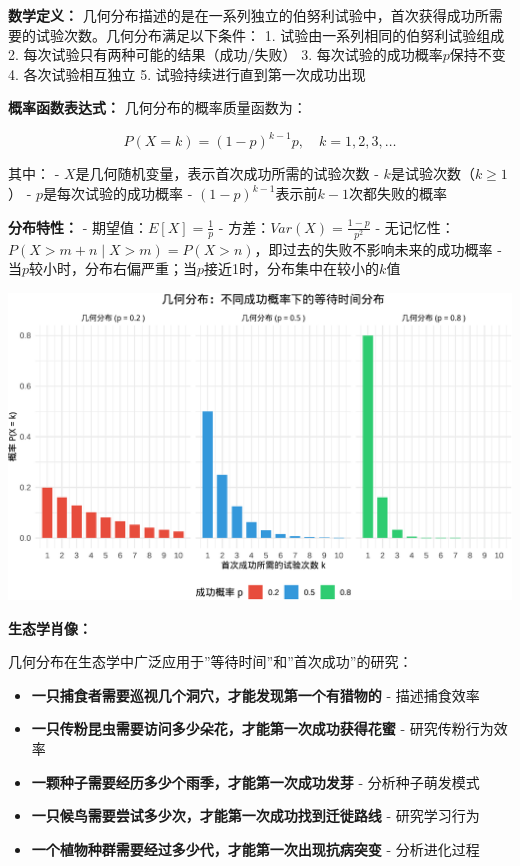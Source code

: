 \documentclass[
]{book}
\providecommand{\tightlist}{%
  \setlength{\itemsep}{0pt}\setlength{\parskip}{0pt}}
\begin{document}
\textbf{数学定义：} 几何分布描述的是在一系列独立的伯努利试验中，首次获得成功所需要的试验次数。几何分布满足以下条件：
1. 试验由一系列相同的伯努利试验组成
2. 每次试验只有两种可能的结果（成功/失败）
3. 每次试验的成功概率\(p\)保持不变
4. 各次试验相互独立
5. 试验持续进行直到第一次成功出现

\textbf{概率函数表达式：} 几何分布的概率质量函数为：

\[P(X = k) = (1-p)^{k-1} p, \quad k = 1, 2, 3, \ldots\]

其中：
- \(X\)是几何随机变量，表示首次成功所需的试验次数
- \(k\)是试验次数（\(k \geq 1\)）
- \(p\)是每次试验的成功概率
- \((1-p)^{k-1}\)表示前\(k-1\)次都失败的概率

\textbf{分布特性：}
- 期望值：\(E[X] = \frac{1}{p}\)
- 方差：\(Var(X) = \frac{1-p}{p^2}\)
- 无记忆性：\(P(X > m+n \mid X > m) = P(X > n)\)，即过去的失败不影响未来的成功概率
- 当\(p\)较小时，分布右偏严重；当\(p\)接近1时，分布集中在较小的\(k\)值

\begin{center}\includegraphics[width=0.8\linewidth]{ecological-statistics_files/figure-latex/unnamed-chunk-24-1} \end{center}

\textbf{生态学肖像：}

几何分布在生态学中广泛应用于''等待时间''和''首次成功''的研究：

\begin{itemize}
\tightlist
\item
  \textbf{一只捕食者需要巡视几个洞穴，才能发现第一个有猎物的} - 描述捕食效率
\item
  \textbf{一只传粉昆虫需要访问多少朵花，才能第一次成功获得花蜜} - 研究传粉行为效率
\item
  \textbf{一颗种子需要经历多少个雨季，才能第一次成功发芽} - 分析种子萌发模式
\item
  \textbf{一只候鸟需要尝试多少次，才能第一次成功找到迁徙路线} - 研究学习行为
\item
  \textbf{一个植物种群需要经过多少代，才能第一次出现抗病突变} - 分析进化过程
\end{itemize}
\end{document}
